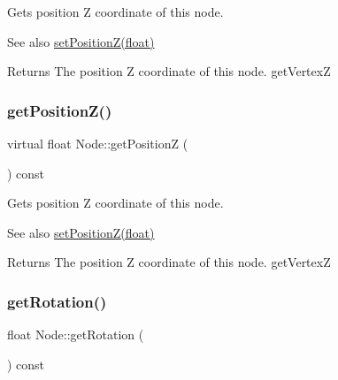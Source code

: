 Gets position Z coordinate of this node.

\begin{DoxySeeAlso}{See also}
\hyperlink{classNode_aaea9bcbb6e5972122c590b930b5a90b9}{set\+Position\+Z(float)}
\end{DoxySeeAlso}
\begin{DoxyReturn}{Returns}
The position Z coordinate of this node.  get\+VertexZ 
\end{DoxyReturn}
\mbox{\label{classNode_a05e59f1a76dd9a1307730da7018b551b}} 
\subsubsection{\texorpdfstring{get\+Position\+Z()}{getPositionZ()}\hspace{0.1cm}{\footnotesize\ttfamily [2/2]}}
{\footnotesize\ttfamily virtual float Node\+::get\+PositionZ (\begin{DoxyParamCaption}{ }\end{DoxyParamCaption}) const\hspace{0.3cm}{\ttfamily [virtual]}}

Gets position Z coordinate of this node.

\begin{DoxySeeAlso}{See also}
\hyperlink{classNode_aaea9bcbb6e5972122c590b930b5a90b9}{set\+Position\+Z(float)}
\end{DoxySeeAlso}
\begin{DoxyReturn}{Returns}
The position Z coordinate of this node.  get\+VertexZ 
\end{DoxyReturn}
\mbox{\label{classNode_aca7139bc3ea6705d41bb65a4fb7ddb6c}} 
\subsubsection{\texorpdfstring{get\+Rotation()}{getRotation()}\hspace{0.1cm}{\footnotesize\ttfamily [1/2]}}
{\footnotesize\ttfamily float Node\+::get\+Rotation (\begin{DoxyParamCaption}{ }\end{DoxyParamCaption}) const\hspace{0.3cm}{\ttfamily [virtual]}}



